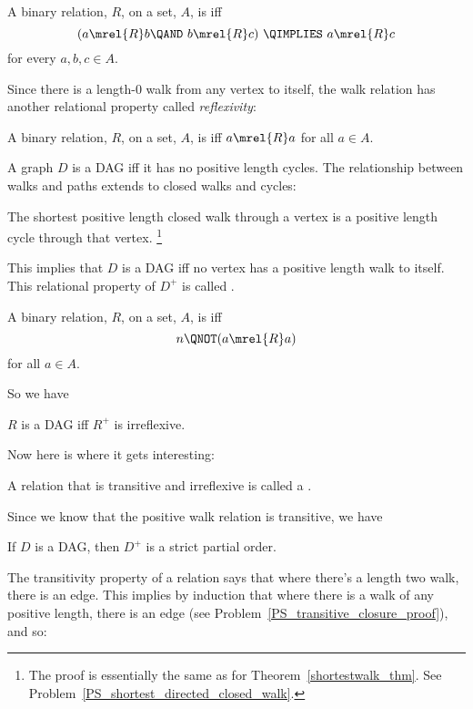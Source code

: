 \begin{definition}
\begin{definition}
A binary relation, $R$, on a set, $A$, is
 iff
\[
(a \mrel{R}  b \QAND\ b \mrel{R}  c)\ \QIMPLIES\  a \mrel{R}  c
\]
\quad for every $a,b,c\in A$.
\end{definition}

Since there is a length-0 walk from any vertex to itself, the walk
relation has another relational property called \emph{reflexivity}:

\begin{definition}
A binary relation, $R$, on a set, $A$, is  iff $a
\mrel{R} a$ for all $a \in A$.
\end{definition}

A graph $D$ is a DAG iff it has no positive length cycles.
The relationship between walks and paths extends to closed walks and
cycles:
\begin{lemma}\label{shortestclosedwalk_lem}
The shortest positive length closed walk through a vertex is a
positive length cycle through that vertex. \footnote{The proof is
  essentially the same as for Theorem~\ref{shortestwalk_thm}.  See
  Problem~\ref{PS_shortest_directed_closed_walk}.}
\end{lemma}
This implies that $D$ is a DAG iff no vertex has a positive length
walk to itself.  This relational property of $D^+$ is called
.

\begin{definition}
A binary relation, $R$, on a set, $A$, is
 iff
\[n
\QNOT(a \mrel{R} a)
\]
for all $a \in A$.
\end{definition}

So we have
\begin{lemma}\label{R+irr}
$R$ is a DAG iff $R^+$ is irreflexive.
\end{lemma}

Now here is where it gets interesting:

\begin{definition}
A relation that is transitive and irreflexive is called a .
\end{definition}

Since we know that the positive walk relation is transitive, we have
\begin{lemma}
If $D$ is a DAG, then $D^+$ is a strict partial order.
\end{lemma}

The transitivity property of a relation says that where there's a
length two walk, there is an edge.  This implies by induction that
where there is a walk of any positive length, there is an edge (see
Problem~\ref{PS_transitive_closure_proof}), and so:


\end{definition}
